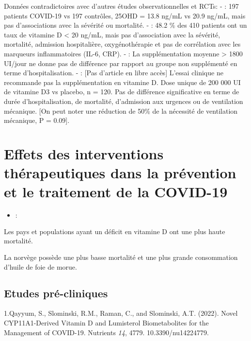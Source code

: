 \documentclass[
  a4paper,
  DIV=11,
  numbers=noendperiod,
  listof=totoc]{scrreprt}
\providecommand{\tightlist}{%
  \setlength{\itemsep}{0pt}\setlength{\parskip}{0pt}}\usepackage{longtable,booktabs,array}
\begin{document}
Données contradictoires avec d'autres études observationnelles et RCTs:
- \textcite{Hernández.2020} : 197 patients COVID-19 vs 197 contrôles,
25OHD = 13.8 ng/mL vs 20.9 ng/mL, mais pas d'associations avec la
sévérité ou mortalité. - \textcite{Jevalikar.2021}: 48.2 \% des 410
patients ont un taux de vitamine D \textless{} 20 ng/mL, mais pas
d'association avec la sévérité, mortalité, admission hospitalière,
oxygénothérapie et pas de corrélation avec les marqueurs inflammatoires
(IL-6, CRP). - \textcite{Cereda.2021} : La supplémentation moyenne
\textgreater{} 1800 UI/jour ne donne pas de différence par rapport au
groupe non supplémenté en terme d'hospitalisation.
-\textcite{Murai.2021} : {[}Pas d'article en libre accès{]} L'essai
clinique ne recommande pas la supplémentation en vitamine D. Dose unique
de 200 000 UI de vitamine D3 vs placebo, n = 120. Pas de différence
significative en terme de durée d'hospitalisation, de mortalité,
d'admission aux urgences ou de ventilation mécanique. {[}On peut noter
une réduction de 50\% de la nécessité de ventilation mécanique, P =
0.09{]}.

\section{Effets des interventions thérapeutiques dans la prévention et
le traitement de la
COVID-19}\label{effets-des-interventions-thuxe9rapeutiques-dans-la-pruxe9vention-et-le-traitement-de-la-covid-19}

\begin{itemize}
\tightlist
\item
  \textcite{Srivastava.2023} :
\end{itemize}

\textcite{Bishop.2021}

Les pays et populations ayant un déficit en vitamine D ont une plus
haute mortalité.

La norvège possède une plus basse mortalité et une plus grande
consommation d'huile de foie de morue.

\subsection{Etudes pré-cliniques}\label{etudes-pruxe9-cliniques}

1.Qayyum, S., Slominski, R.M., Raman, C., and Slominski, A.T. (2022).
Novel CYP11A1-Derived Vitamin D and Lumisterol Biometabolites for the
Management of COVID-19. Nutrients \emph{14}, 4779. 10.3390/nu14224779.
\end{document}
